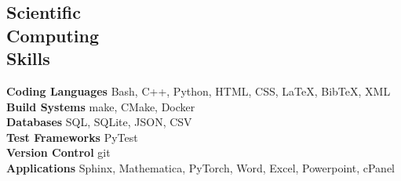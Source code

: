 \documentclass[margin,line]{resume}
\begin{document}
\begin{resume}
    \section{\mysidestyle Scientific\\Computing\\Skills}
        \textbf{Coding Languages} \hfill Bash, C++, Python, HTML, CSS, \LaTeX, BibTeX, XML \vspace{.5mm}\\%
        \textbf{Build Systems} \hfill make, CMake, Docker\vspace{.5mm}\\%
        \textbf{Databases} \hfill SQL, SQLite, JSON, CSV\vspace{.5mm}\\%
        \textbf{Test Frameworks} \hfill PyTest\vspace{.5mm}\\%
        \textbf{Version Control} \hfill git\vspace{.5mm}\\%
        \textbf{Applications} \hfill Sphinx, Mathematica, PyTorch, Word, Excel, Powerpoint, cPanel\vspace{.5mm}%

\end{resume}
\end{document}

